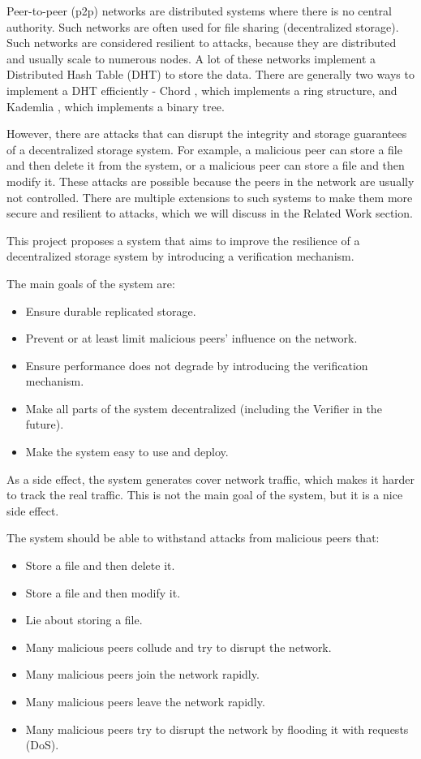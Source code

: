 \documentclass[ twoside,openright,titlepage,numbers=noenddot,headinclude,%
                footinclude=true,cleardoublepage=empty,abstractoff, %
                BCOR=5mm,paper=a4,fontsize=11pt,%
                ngerman,american,%
                ]{scrreprt}
\begin{document}
Peer-to-peer (p2p) networks are distributed systems where there is no central authority.
Such networks are often used for file sharing (decentralized storage).
Such networks are considered resilient to attacks,
because they are distributed and usually scale to numerous nodes.
A lot of these networks implement a Distributed Hash Table (DHT) to store the data.
There are generally two ways to implement a DHT efficiently - 
Chord \cite{chord}, which implements a ring structure,
and Kademlia \cite{kademlia}, which implements a binary tree.

However, there are attacks that can disrupt the integrity and
storage guarantees of a decentralized storage system.
For example, a malicious peer can store a file and then delete it from the system,
or a malicious peer can store a file and then modify it.
These attacks are possible because the peers in the network are usually not controlled.
There are multiple extensions to such systems to make them more secure and resilient to attacks,
which we will discuss in the Related Work section.

This project proposes a system that aims to improve the resilience of a decentralized storage system
by introducing a verification mechanism.

The main goals of the system are:
\begin{itemize}
    \item Ensure durable replicated storage.
    \item Prevent or at least limit malicious peers' influence on the network.
    \item Ensure performance does not degrade by introducing the verification mechanism.
    \item Make all parts of the system decentralized (including the Verifier in the future).
    \item Make the system easy to use and deploy.
\end{itemize}

As a side effect, the system generates cover network traffic, which makes it harder to track the real traffic.
This is not the main goal of the system, but it is a nice side effect.

The system should be able to withstand attacks from malicious peers that:
\begin{itemize}
    \item Store a file and then delete it.
    \item Store a file and then modify it.
    \item Lie about storing a file.
    \item Many malicious peers collude and try to disrupt the network.
    \item Many malicious peers join the network rapidly.
    \item Many malicious peers leave the network rapidly.
    \item Many malicious peers try to disrupt the network by flooding it with requests (DoS).
\end{itemize}
\end{document}
